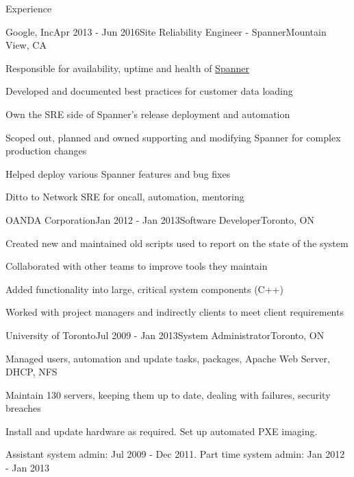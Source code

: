 \documentclass{resume}
\begin{document}
\begin{rSection}{Experience}
    \begin{rSubsection}{Google, Inc}{Apr 2013 - Jun 2016}{Site Reliability Engineer - Spanner}{Mountain View, CA}
      \item Responsible for availability, uptime and health of \href{https://en.wikipedia.org/wiki/Spanner_(database)}{Spanner}
      \item Developed and documented best practices for customer data loading
      \item Own the SRE side of Spanner's release deployment and automation
      \item Scoped out, planned and owned supporting and modifying Spanner for complex production changes
      \item Helped deploy various Spanner features and bug fixes
      \item Ditto to Network SRE for oncall, automation, mentoring
    \end{rSubsection}

    \begin{rSubsection}{OANDA Corporation}{Jan 2012 - Jan 2013}{Software Developer}{Toronto, ON}
      \item Created new and maintained old scripts used to report on the state of the system
      \item Collaborated with other teams to improve tools they maintain
      \item Added functionality into large, critical system components (C++)
      \item Worked with project managers and indirectly clients to meet client requirements
    \end{rSubsection}

    \begin{rSubsection}{University of Toronto}{Jul 2009 - Jan 2013}{System Administrator}{Toronto, ON}
      \item Managed users, automation and update tasks, packages, Apache Web Server, DHCP, NFS
      \item Maintain 130 servers, keeping them up to date, dealing with failures, security breaches
      \item Install and update hardware as required.  Set up automated PXE imaging.
      \item Assistant system admin: Jul 2009 - Dec 2011. Part time system admin: Jan 2012 - Jan 2013
    \end{rSubsection}


\end{rSection}
\end{document}

